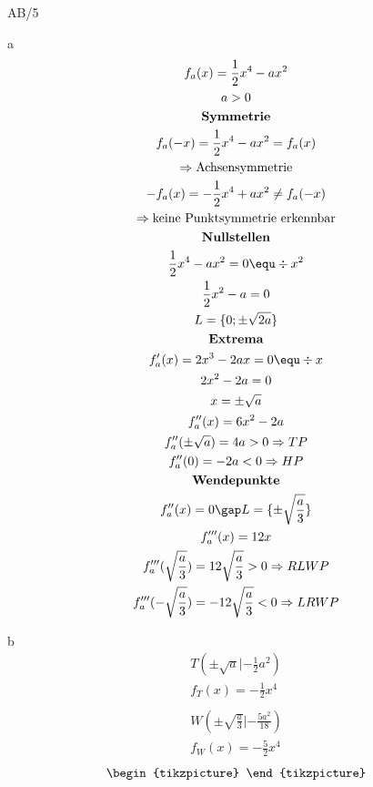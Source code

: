 \begin{exercise}{AB/5}
  \item [a]
  \begin{gather*}
    f_a(x) = \frac{1}{2}x^4 - ax^2 \\
    a > 0 \\
    \textbf{Symmetrie} \\
    f_a(-x) = \frac{1}{2}x^4 - ax^2 = f_a(x) \\
    \Rightarrow \text{Achsensymmetrie} \\
    -f_a(x) = -\frac{1}{2}x^4 + ax^2 \neq f_a(-x) \\
    \Rightarrow \text{keine Punktsymmetrie erkennbar} \\
    \textbf{Nullstellen} \\
    \frac{1}{2}x^4 - ax^2 = 0 \equ \div x^2 \\
    \frac{1}{2}x^2 - a = 0 \\
    L = \{0; \pm\sqrt{2a}\} \\
    \textbf{Extrema} \\
    f_a'(x) = 2x^3 - 2ax = 0 \equ \div x \\
    2x^2 - 2a = 0 \\
    x = \pm\sqrt{a} \\
    f_a''(x) = 6x^2 - 2a \\
    f_a''(\pm\sqrt{a}) = 4a > 0 \Rightarrow TP \\
    f_a''(0) = -2a < 0 \Rightarrow HP \\
    \textbf{Wendepunkte} \\
    f_a''(x) = 0 \gap L = \{\pm\sqrt{\frac{a}{3}}\} \\
    f_a'''(x) = 12x \\
    f_a'''(\sqrt{\frac{a}{3}}) = 12\sqrt{\frac{a}{3}} > 0 \Rightarrow RLWP \\
    f_a'''(-\sqrt{\frac{a}{3}}) = -12\sqrt{\frac{a}{3}} < 0 \Rightarrow LRWP
  \end{gather*}
  \item [b]
  \begin{gather*}
    T(\pm\sqrt{a}|-\frac{1}{2}a^2) \\
    f_T(x) = -\frac{1}{2}x^4 \\\\
    W(\pm\sqrt{\frac{a}{3}}|-\frac{5a^2}{18}) \\
    f_W(x) = -\frac{5}{2}x^4
  \end{gather*}
  \begin{gather*}
    \begin{tikzpicture}

\end{tikzpicture}
\end{gather*}
\end{exercise}
